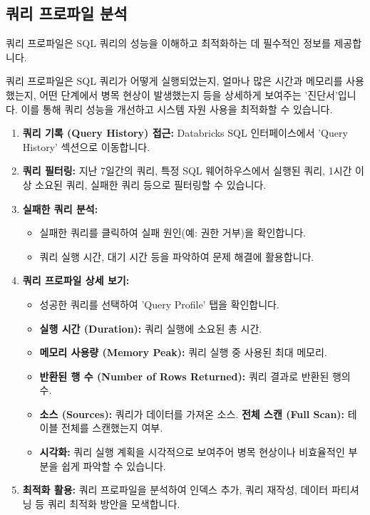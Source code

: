 \documentclass[11pt,a4paper]{article}
\theoremstyle{definition}
\begin{document}
\subsection{쿼리 프로파일 분석}
쿼리 프로파일은 SQL 쿼리의 성능을 이해하고 최적화하는 데 필수적인 정보를 제공합니다.

\begin{summarybox}[title=핵심 요약: 쿼리 성능 진단서]
쿼리 프로파일은 SQL 쿼리가 어떻게 실행되었는지, 얼마나 많은 시간과 메모리를 사용했는지, 어떤 단계에서 병목 현상이 발생했는지 등을 상세하게 보여주는 '진단서'입니다. 이를 통해 쿼리 성능을 개선하고 시스템 자원 사용을 최적화할 수 있습니다.
\end{summarybox}

\begin{enumerate}
    \item \textbf{쿼리 기록 (Query History) 접근:} Databricks SQL 인터페이스에서 'Query History' 섹션으로 이동합니다.
    \item \textbf{쿼리 필터링:} 지난 7일간의 쿼리, 특정 SQL 웨어하우스에서 실행된 쿼리, 1시간 이상 소요된 쿼리, 실패한 쿼리 등으로 필터링할 수 있습니다.
    \item \textbf{실패한 쿼리 분석:}
    \begin{itemize}
        \item 실패한 쿼리를 클릭하여 실패 원인(예: 권한 거부)을 확인합니다.
        \item 쿼리 실행 시간, 대기 시간 등을 파악하여 문제 해결에 활용합니다.
    \end{itemize}
    \item \textbf{쿼리 프로파일 상세 보기:}
    \begin{itemize}
        \item 성공한 쿼리를 선택하여 'Query Profile' 탭을 확인합니다.
        \item \textbf{실행 시간 (Duration):} 쿼리 실행에 소요된 총 시간.
        \item \textbf{메모리 사용량 (Memory Peak):} 쿼리 실행 중 사용된 최대 메모리.
        \item \textbf{반환된 행 수 (Number of Rows Returned):} 쿼리 결과로 반환된 행의 수.
        \item \textbf{소스 (Sources):} 쿼리가 데이터를 가져온 소스.
        \textbf{전체 스캔 (Full Scan):} 테이블 전체를 스캔했는지 여부.
        \item \textbf{시각화:} 쿼리 실행 계획을 시각적으로 보여주어 병목 현상이나 비효율적인 부분을 쉽게 파악할 수 있습니다.
    \end{itemize}
    \item \textbf{최적화 활용:} 쿼리 프로파일을 분석하여 인덱스 추가, 쿼리 재작성, 데이터 파티셔닝 등 쿼리 최적화 방안을 모색합니다.
\end{enumerate}
\end{document}
